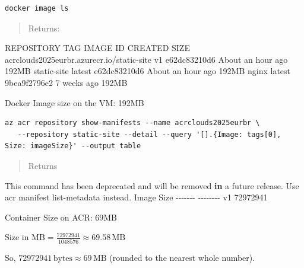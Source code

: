 \documentclass[11pt]{article}
\newenvironment{Shaded}{}{}
\newcommand{\KeywordTok}[1]{\textcolor[rgb]{0.00,0.44,0.13}{\textbf{{#1}}}}
\newcommand{\DecValTok}[1]{\textcolor[rgb]{0.25,0.63,0.44}{{#1}}}
\newcommand{\StringTok}[1]{\textcolor[rgb]{0.25,0.44,0.63}{{#1}}}
\newcommand{\FunctionTok}[1]{\textcolor[rgb]{0.02,0.16,0.49}{{#1}}}
\newcommand{\NormalTok}[1]{{#1}}
\newcommand{\OperatorTok}[1]{\textcolor[rgb]{0.40,0.40,0.40}{{#1}}}
\begin{document}
\begin{verbatim}
docker image ls
\end{verbatim}

\begin{quote}
Returns:
\end{quote}

\begin{Shaded}
\begin{Highlighting}[]
\NormalTok{REPOSITORY                                  TAG       IMAGE ID       CREATED             SIZE}
\NormalTok{acrclouds2025eurbr}\OperatorTok{.}\FunctionTok{azurecr}\OperatorTok{.}\FunctionTok{io}\OperatorTok{/}\NormalTok{static{-}site   v1        e62dc83210d6   About an hour ago   192MB}
\NormalTok{static{-}site                                 latest    e62dc83210d6   About an hour ago   192MB}
\NormalTok{nginx                                       latest    9bea9f2796e2   }\DecValTok{7}\NormalTok{ weeks ago         192MB}
\end{Highlighting}
\end{Shaded}

Docker Image size on the VM: 192MB

\begin{verbatim}
az acr repository show-manifests --name acrclouds2025eurbr \
   --repository static-site --detail --query '[].{Image: tags[0], Size: imageSize}' --output table
\end{verbatim}

\begin{quote}
Returns
\end{quote}

\begin{Shaded}
\begin{Highlighting}[]
\NormalTok{This command has been deprecated and will be removed }\KeywordTok{in}\NormalTok{ a future release}\OperatorTok{.}\NormalTok{ Use }\StringTok{\textquotesingle{}acr manifest list{-}metadata\textquotesingle{}}\NormalTok{ instead}\OperatorTok{.}
\NormalTok{Image    Size}
\OperatorTok{{-}{-}{-}{-}{-}{-}{-}}  \OperatorTok{{-}{-}{-}{-}{-}{-}{-}{-}}
\NormalTok{v1       }\DecValTok{72972941}
\end{Highlighting}
\end{Shaded}

Container Size on ACR: 69MB

\(\text{Size in MB} = \frac{72972941}{1048576} \approx 69.58 \, \text{MB}\)

So, \(72972941 \, \text{bytes} \approx 69 \, \text{MB}\) (rounded to the
nearest whole number).
\end{document}
